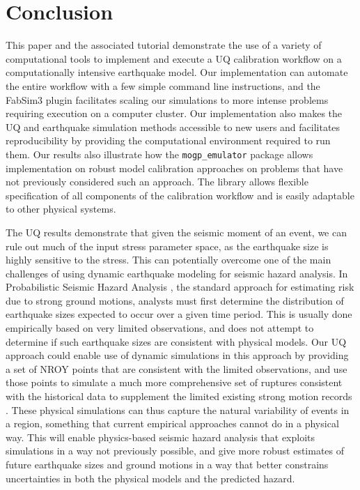 \documentclass[openacc]{rstransa}%
\begin{document}
\section{Conclusion}

This paper and the associated tutorial demonstrate the use of a variety of computational tools
to implement and execute a UQ calibration workflow on a computationally intensive earthquake
model. Our implementation can automate the entire workflow with a few simple command line
instructions, and the FabSim3 plugin facilitates scaling our simulations to more intense
problems requiring execution on a computer cluster. Our implementation also makes the UQ
and earthquake simulation methods accessible to new users and facilitates reproducibility
by providing the computational environment required to run them.
Our results also illustrate how the \texttt{mogp\_emulator} package allows implementation on
robust model calibration approaches on problems that have not previously considered such
an approach. The library allows flexible specification of all components of the calibration
workflow and is easily adaptable to other physical systems.

The UQ results demonstrate that given the seismic moment of an event, we can rule out
much of the input stress parameter space, as the earthquake size is highly sensitive to
the stress. This can potentially overcome one of the main challenges of using dynamic
earthquake modeling for seismic hazard analysis. In Probabilistic Seismic Hazard Analysis \cite{psha},
the standard approach for estimating risk due to strong ground motions, analysts must
first determine the distribution of earthquake sizes expected to occur over a given time period.
This is usually done empirically based on very limited observations, and does not attempt
to determine if such earthquake sizes are consistent with physical models.
Our UQ approach could enable use of dynamic simulations in this approach by providing a set
of NROY points that are consistent with the limited observations, and use those points to
simulate a much more comprehensive set of ruptures consistent with the historical data
to supplement the limited existing strong motion records \cite{gmpe}.
These physical simulations can thus capture the natural variability of events in a region,
something that current empirical approaches cannot do in a physical way.
This will enable
physics-based seismic hazard analysis that exploits simulations in a way not previously
possible, and give more robust estimates of future earthquake sizes and ground motions
in a way that better constrains uncertainties in both the physical models and the
predicted hazard.
\end{document}

